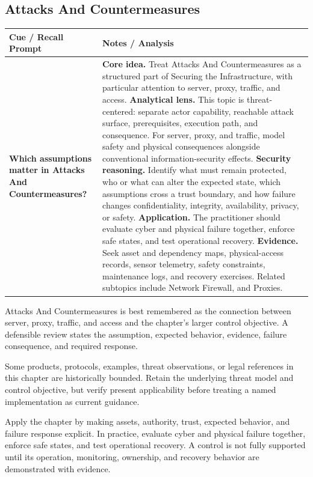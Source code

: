 \documentclass[11pt]{article}
\newcommand{\CornellHeader}{%
\rowcolor{Navy}\color{white}\bfseries Cue / Recall Prompt & \color{white}\bfseries Notes / Analysis\\\hline}
\newcommand{\CornellRow}[2]{%
\cellcolor{CueGray}\RaggedRight\textbf{#1} & \RaggedRight #2\\\hline}
\begin{document}
\subsection*{Attacks And Countermeasures}
\begin{longtable}{>{\RaggedRight\arraybackslash}p{}|>{\RaggedRight\arraybackslash}p{}}
\CornellHeader
\CornellRow{Which assumptions matter in Attacks And Countermeasures?}{\textbf{Core idea.} Treat Attacks And Countermeasures as a structured part of Securing the Infrastructure, with particular attention to server, proxy, traffic, and access. \textbf{Analytical lens.} This topic is threat-centered: separate actor capability, reachable attack surface, prerequisites, execution path, and consequence. For server, proxy, and traffic, model safety and physical consequences alongside conventional information-security effects. \textbf{Security reasoning.} Identify what must remain protected, who or what can alter the expected state, which assumptions cross a trust boundary, and how failure changes confidentiality, integrity, availability, privacy, or safety. \textbf{Application.} The practitioner should evaluate cyber and physical failure together, enforce safe states, and test operational recovery. \textbf{Evidence.} Seek asset and dependency maps, physical-access records, sensor telemetry, safety constraints, maintenance logs, and recovery exercises. Related subtopics include Network Firewall, and Proxies.}
\end{longtable}
\begin{topicsummary}
Attacks And Countermeasures is best remembered as the connection between server, proxy, traffic, and access and the chapter's larger control objective. A defensible review states the assumption, expected behavior, evidence, failure consequence, and required response.
\end{topicsummary}
\begin{historybox}
Some products, protocols, examples, threat observations, or legal references in this chapter are historically bounded. Retain the underlying threat model and control objective, but verify present applicability before treating a named implementation as current guidance.
\end{historybox}
\begin{defensebox}
Apply the chapter by making assets, authority, trust, expected behavior, and failure response explicit. In practice, evaluate cyber and physical failure together, enforce safe states, and test operational recovery. A control is not fully supported until its operation, monitoring, ownership, and recovery behavior are demonstrated with evidence.
\end{defensebox}
\end{document}
